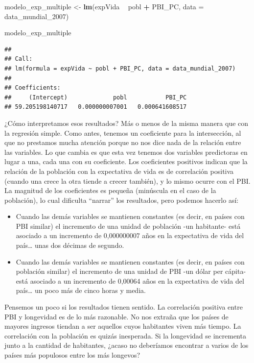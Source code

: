 \documentclass[]{book}
\newenvironment{Shaded}{\begin{snugshade}}{\end{snugshade}}
\newcommand{\KeywordTok}[1]{\textcolor[rgb]{0.13,0.29,0.53}{\textbf{#1}}}
\newcommand{\DataTypeTok}[1]{\textcolor[rgb]{0.13,0.29,0.53}{#1}}
\newcommand{\DecValTok}[1]{\textcolor[rgb]{0.00,0.00,0.81}{#1}}
\newcommand{\StringTok}[1]{\textcolor[rgb]{0.31,0.60,0.02}{#1}}
\newcommand{\OperatorTok}[1]{\textcolor[rgb]{0.81,0.36,0.00}{\textbf{#1}}}
\newcommand{\NormalTok}[1]{#1}
\providecommand{\tightlist}{%
  \setlength{\itemsep}{0pt}\setlength{\parskip}{0pt}}
\begin{document}
\begin{Shaded}
\begin{Highlighting}[]
\NormalTok{modelo_exp_multiple <-}\StringTok{ }\KeywordTok{lm}\NormalTok{(expVida }\OperatorTok{~}\StringTok{ }\NormalTok{pobl }\OperatorTok{+}\StringTok{ }\NormalTok{PBI_PC, }\DataTypeTok{data =}\NormalTok{ data_mundial_}\DecValTok{2007}\NormalTok{)}

\NormalTok{modelo_exp_multiple}
\end{Highlighting}
\end{Shaded}

\begin{verbatim}
## 
## Call:
## lm(formula = expVida ~ pobl + PBI_PC, data = data_mundial_2007)
## 
## Coefficients:
##     (Intercept)             pobl           PBI_PC  
## 59.205198140717   0.000000007001   0.000641608517
\end{verbatim}

¿Cómo interpretamos esos resultados? Más o menos de la misma manera que
con la regresión simple. Como antes, tenemos un coeficiente para la
intersección, al que no prestamos mucha atención porque no nos dice nada
de la relación entre las variables. Lo que cambia es que esta vez
tenemos dos variables predictoras en lugar a una, cada una con su
coeficiente. Los coeficientes positivos indican que la relación de la
población con la expectativa de vida es de correlación positiva (cuando
una crece la otra tiende a crecer también), y lo mismo ocurre con el
PBI. La magnitud de los coeficientes es pequeña (minúscula en el caso de
la población), lo cual dificulta ``narrar'' los resultados, pero podemos
hacerlo así:

\begin{itemize}
\tightlist
\item
  Cuando las demás variables se mantienen constantes (es decir, en
  países con PBI similar) el incremento de una unidad de población -un
  habitante- está asociado a un incremento de 0,000000007 años en la
  expectativa de vida del país\ldots{} unas dos décimas de segundo.
\item
  Cuando las demás variables se mantienen constantes (es decir, en
  países con población similar) el incremento de una unidad de PBI -un
  dólar per cápita- está asociado a un incremento de 0,00064 años en la
  expectativa de vida del país\ldots{} un poco más de cinco horas y
  media.
\end{itemize}

Pensemos un poco si los resultados tienen sentido. La correlación
positiva entre PBI y longevidad es de lo más razonable. No nos extraña
que los países de mayores ingresos tiendan a ser aquellos cuyos
habitantes viven más tiempo. La correlación con la población es quizás
inesperada. Si la longevidad se incrementa junto a la cantidad de
habitantes, ¿acaso no deberíamos encontrar a varios de los países más
populosos entre los más longevos?
\end{document}
